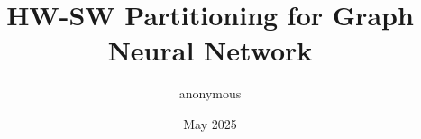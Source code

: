 \documentclass{article}
\title{HW-SW Partitioning for Graph Neural Network}
\author{anonymous}
\date{May 2025}
\begin{document}
\maketitle









% 
% 
% 
% 
% 

\FloatBarrier




\end{document}
